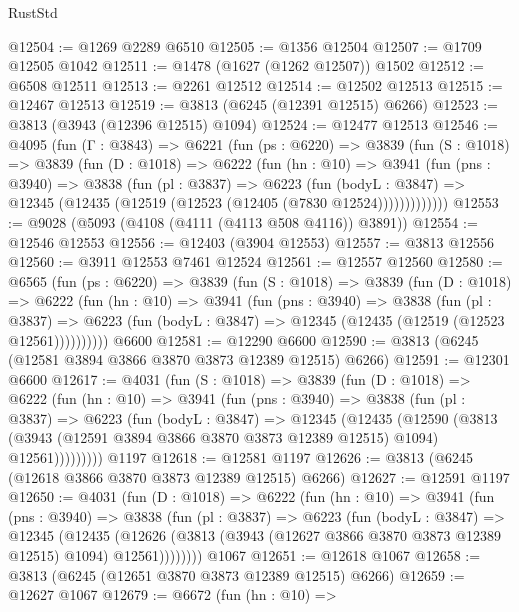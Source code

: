 \begin{lexlean}{RustStd}
\begin{coremodule}
@12504 := @1269 @2289 @6510
@12505 := @1356 @12504
@12507 := @1709 @12505 @1042
@12511 := @1478 (@1627 (@1262 @12507)) @1502
@12512 := @6508 @12511
@12513 := @2261 @12512
@12514 := @12502 @12513
@12515 := @12467 @12513
@12519 := @3813 (@6245 (@12391 @12515) @6266)
@12523 := @3813 (@3943 (@12396 @12515) @1094)
@12524 := @12477 @12513
@12546 := @4095
    (fun (Γ : @3843) =>
    @6221
      (fun (ps : @6220) =>
      @3839
        (fun (S : @1018) =>
        @3839
          (fun (D : @1018) =>
          @6222
            (fun (hn : @10) =>
            @3941
              (fun (pns : @3940) =>
              @3838
                (fun (pl : @3837) =>
                @6223
                  (fun (bodyL : @3847) =>
                  @12345 (@12435 (@12519 (@12523 (@12405 (@7830 @12524)))))))))))))
@12553 := @9028 (@5093 (@4108 (@4111 (@4113 @508 @4116)) @3891))
@12554 := @12546 @12553
@12556 := @12403 (@3904 @12553)
@12557 := @3813 @12556
@12560 := @3911 @12553 @7461 @12524
@12561 := @12557 @12560
@12580 := @6565
    (fun (ps : @6220) =>
    @3839
      (fun (S : @1018) =>
      @3839
        (fun (D : @1018) =>
        @6222
          (fun (hn : @10) =>
          @3941
            (fun (pns : @3940) =>
            @3838
              (fun (pl : @3837) =>
              @6223 (fun (bodyL : @3847) => @12345 (@12435 (@12519 (@12523 @12561))))))))))
    @6600
@12581 := @12290 @6600
@12590 := @3813 (@6245 (@12581 @3894 @3866 @3870 @3873 @12389 @12515) @6266)
@12591 := @12301 @6600
@12617 := @4031
    (fun (S : @1018) =>
    @3839
      (fun (D : @1018) =>
      @6222
        (fun (hn : @10) =>
        @3941
          (fun (pns : @3940) =>
          @3838
            (fun (pl : @3837) =>
            @6223
              (fun (bodyL : @3847) =>
              @12345
                (@12435
                  (@12590
                    (@3813
                      (@3943 (@12591 @3894 @3866 @3870 @3873 @12389 @12515) @1094)
                      @12561)))))))))
    @1197
@12618 := @12581 @1197
@12626 := @3813 (@6245 (@12618 @3866 @3870 @3873 @12389 @12515) @6266)
@12627 := @12591 @1197
@12650 := @4031
    (fun (D : @1018) =>
    @6222
      (fun (hn : @10) =>
      @3941
        (fun (pns : @3940) =>
        @3838
          (fun (pl : @3837) =>
          @6223
            (fun (bodyL : @3847) =>
            @12345
              (@12435
                (@12626 (@3813 (@3943 (@12627 @3866 @3870 @3873 @12389 @12515) @1094) @12561))))))))
    @1067
@12651 := @12618 @1067
@12658 := @3813 (@6245 (@12651 @3870 @3873 @12389 @12515) @6266)
@12659 := @12627 @1067
@12679 := @6672
    (fun (hn : @10) =>

\end{coremodule}
\end{lexlean}

